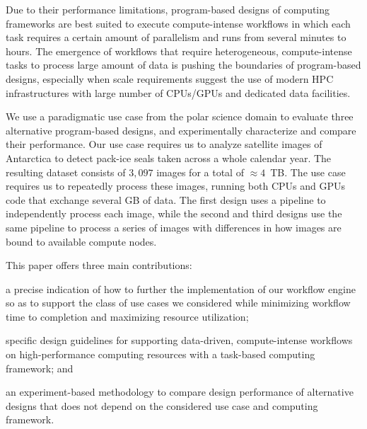 Due to their performance limitations, program-based designs of computing frameworks are best suited to execute compute-intense workflows in which each task requires a certain amount of parallelism and runs from several minutes to hours.
The emergence of workflows that require heterogeneous, compute-intense tasks to process large amount of data is pushing the boundaries of program-based designs, especially when scale requirements suggest the use of modern HPC infrastructures with large number of CPUs/GPUs and dedicated data facilities.

We use a paradigmatic use case from the polar science domain to evaluate three alternative program-based designs, and experimentally characterize and compare their performance.
Our use case requires us to analyze satellite images of Antarctica to detect pack-ice seals taken across a whole calendar year.
The resulting dataset consists of $3,097$ images for a total of $\approx4$~TB.
The use case requires us to repeatedly process these images, running both CPUs and GPUs code that exchange several GB of data.
The first design uses a pipeline to independently process each image, while the second and third designs use the same pipeline to process a series of images with differences in how images are bound to available compute nodes.

This paper offers three main contributions: 
\begin{inparaenum}[(1)]
    \item a precise indication of how to further the implementation of our workflow engine so as to support the class of use cases we considered while minimizing workflow time to completion and maximizing resource utilization;
    \item specific design guidelines for supporting data-driven, compute-intense workflows on high-performance computing resources with a task-based computing framework; and
    \item an experiment-based methodology to compare design performance of alternative designs that does not depend on the considered use case and computing framework.
\end{inparaenum}

